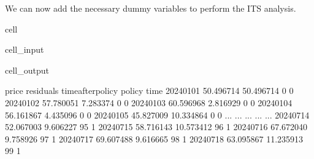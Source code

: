 \documentclass[letterpaper,10pt,english]{jupyterBook}
\begin{document}
\sphinxAtStartPar
We can now add the necessary dummy variables to perform the ITS analysis.

\begin{sphinxuseclass}{cell}\begin{sphinxVerbatimInput}

\begin{sphinxuseclass}{cell_input}
\begin{sphinxVerbatim}[commandchars=\\\{\}]
\PYG{p}{[}\PYG{p}{]}    \PYG{p}{[}\PYG{p}{]}    
\PYG{p}{[}\PYG{p}{]}    \PYG{p}{[}\PYG{p}{]}  

\end{sphinxVerbatim}

\end{sphinxuseclass}\end{sphinxVerbatimInput}
\begin{sphinxVerbatimOutput}

\begin{sphinxuseclass}{cell_output}
\begin{sphinxVerbatim}[commandchars=\\\{\}]
                price  residuals  time\PYGZus{}after\PYGZus{}policy  policy
time                                                       
2024\PYGZhy{}01\PYGZhy{}01  50.496714  50.496714                  0       0
2024\PYGZhy{}01\PYGZhy{}02  57.780051   7.283374                  0       0
2024\PYGZhy{}01\PYGZhy{}03  60.596968   2.816929                  0       0
2024\PYGZhy{}01\PYGZhy{}04  56.161867  \PYGZhy{}4.435096                  0       0
2024\PYGZhy{}01\PYGZhy{}05  45.827009 \PYGZhy{}10.334864                  0       0
...               ...        ...                ...     ...
2024\PYGZhy{}07\PYGZhy{}14  52.067003  \PYGZhy{}9.606227                 95       1
2024\PYGZhy{}07\PYGZhy{}15  58.716143 \PYGZhy{}10.573412                 96       1
2024\PYGZhy{}07\PYGZhy{}16  67.672040  \PYGZhy{}9.758926                 97       1
2024\PYGZhy{}07\PYGZhy{}17  69.607488  \PYGZhy{}9.616665                 98       1
2024\PYGZhy{}07\PYGZhy{}18  63.095867 \PYGZhy{}11.235913                 99       1


\end{sphinxVerbatim}
\end{sphinxuseclass}
\end{sphinxVerbatimOutput}
\end{sphinxuseclass}
\end{document}
